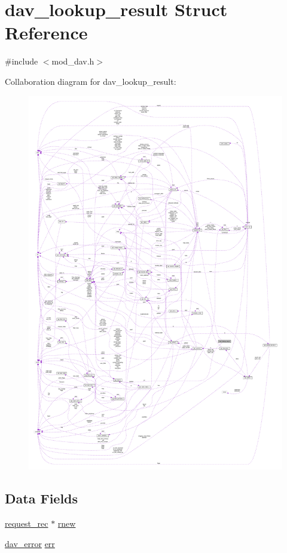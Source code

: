 \hypertarget{structdav__lookup__result}{}\section{dav\+\_\+lookup\+\_\+result Struct Reference}
\label{structdav__lookup__result}


{\ttfamily \#include $<$mod\+\_\+dav.\+h$>$}



Collaboration diagram for dav\+\_\+lookup\+\_\+result\+:
\nopagebreak
\begin{figure}[H]
\begin{center}
\leavevmode
\includegraphics[width=350pt]{structdav__lookup__result__coll__graph}
\end{center}
\end{figure}
\subsection*{Data Fields}
\begin{DoxyCompactItemize}
\item 
\hyperlink{structrequest__rec}{request\+\_\+rec} $\ast$ \hyperlink{structdav__lookup__result_a227eca16f8f08e0ce7c49e3706e70160}{rnew}
\item 
\hyperlink{structdav__error}{dav\+\_\+error} \hyperlink{structdav__lookup__result_a28f31e5bff1099045dba379393d931a1}{err}
\end{DoxyCompactItemize}


